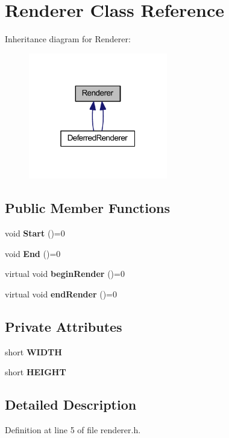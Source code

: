 \hypertarget{class_renderer}{}\section{Renderer Class Reference}
\label{class_renderer}


Inheritance diagram for Renderer\+:
\nopagebreak
\begin{figure}[H]
\begin{center}
\leavevmode
\includegraphics[width=172pt]{class_renderer__inherit__graph}
\end{center}
\end{figure}
\subsection*{Public Member Functions}
\begin{DoxyCompactItemize}
\item 
void {\bfseries Start} ()=0\hypertarget{class_renderer_acdb2d4e72175ec9055cf204d9212532d}{}\label{class_renderer_acdb2d4e72175ec9055cf204d9212532d}

\item 
void {\bfseries End} ()=0\hypertarget{class_renderer_ad375f4db6fb8b7f1567321769c4d67f0}{}\label{class_renderer_ad375f4db6fb8b7f1567321769c4d67f0}

\item 
virtual void {\bfseries begin\+Render} ()=0\hypertarget{class_renderer_ae180d2117b75aabcceef8fbdb49f9128}{}\label{class_renderer_ae180d2117b75aabcceef8fbdb49f9128}

\item 
virtual void {\bfseries end\+Render} ()=0\hypertarget{class_renderer_a0d526351ba47fbd60264a929117912c5}{}\label{class_renderer_a0d526351ba47fbd60264a929117912c5}

\end{DoxyCompactItemize}
\subsection*{Private Attributes}
\begin{DoxyCompactItemize}
\item 
short {\bfseries W\+I\+D\+TH}\hypertarget{class_renderer_ab46ad12794cab3387e152dffc4a64298}{}\label{class_renderer_ab46ad12794cab3387e152dffc4a64298}

\item 
short {\bfseries H\+E\+I\+G\+HT}\hypertarget{class_renderer_ae85e44c9a924e80d19b63117e78f40c6}{}\label{class_renderer_ae85e44c9a924e80d19b63117e78f40c6}

\end{DoxyCompactItemize}


\subsection{Detailed Description}


Definition at line 5 of file renderer.\+h.

